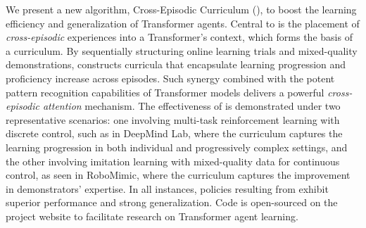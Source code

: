 We present a new algorithm, Cross-Episodic Curriculum (\cec), to boost the learning efficiency and generalization of Transformer agents. 
Central to \cec is the placement of \textit{cross-episodic} experiences into a Transformer’s context, which forms the basis of a curriculum.
By sequentially structuring online learning trials and mixed-quality demonstrations,
\cec constructs curricula that encapsulate learning progression and proficiency increase across episodes.
Such synergy combined with the potent pattern recognition capabilities of Transformer models delivers a powerful \emph{cross-episodic attention} mechanism.
The effectiveness of \cec is demonstrated under two representative scenarios: one involving multi-task reinforcement learning with discrete control, such as in DeepMind Lab, where the curriculum captures the learning progression in both individual and progressively complex settings, and the other involving imitation learning with mixed-quality data for continuous control, as seen in RoboMimic, where the curriculum captures the improvement in demonstrators' expertise.
In all instances, policies resulting from \cec exhibit superior performance and strong generalization.
Code is open-sourced on the project website \webpage{} to facilitate research on Transformer agent learning.

